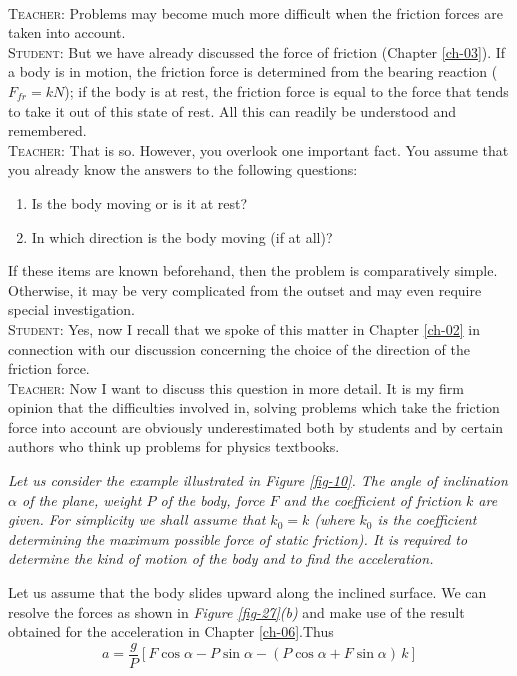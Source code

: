 \documentclass[a4paper,sfsidenotes]{tufte-book}
\begin{document}
\paragraph{}
\textsc{Teacher:} Problems may become much more difficult when the friction forces are taken into account.
\\
\textsc{Student:} But we have already discussed the force of friction (Chapter \ref{ch-03}). If a body is in motion, the friction force is determined from the bearing reaction ($F_{fr}=kN$); if the body is at rest, the friction force is equal to the force that tends to take it out of this state of rest. All this can readily be understood and remembered.
\\
\textsc{Teacher:} That is so. However, you overlook one important fact. You assume that you already know the answers to the following questions: 
\begin{enumerate}[label=(\arabic*),leftmargin=1cm]
\item Is the body moving or is it at rest? 
\item In which direction is the body moving (if at all)? 
\end{enumerate}

If these items are known beforehand, then the problem is comparatively simple. Otherwise, it may be very complicated from the outset and may even require special investigation.
\\
\textsc{Student:} Yes, now I recall that we spoke of this matter in Chapter \ref{ch-02} in connection with our discussion concerning the choice of the direction of the friction force.
\\
\textsc{Teacher:} Now I want to discuss this question in more detail. It is my firm opinion that the difficulties involved in, solving problems which take the friction force into account are obviously underestimated both by students and by certain authors who think up problems for physics textbooks.

\emph{Let us consider the example illustrated in \emph{Figure \ref{fig-10}}. The angle of inclination $\alpha$ of the plane, weight $P$ of the body, force $F$ and the coefficient of friction $k$ are given. For simplicity we shall assume that $k_{0}=k$ (where $k_{0}$ is the coefficient determining the maximum possible force of static friction). It is required to determine the kind of motion of the body and to find
the acceleration.}

Let us assume that the body slides upward along the inclined surface. We can resolve the forces as shown in \emph{Figure \ref{fig-27}(b)} and make use of the result obtained for the acceleration in  Chapter \ref{ch-06}.Thus
\begin{equation}
a = \frac{g}{P} \left[F \cos \alpha- P \sin \alpha -(P \cos \alpha + F \sin \alpha) \, k \right]
\label{eq-24}
\end{equation}
\end{document}
